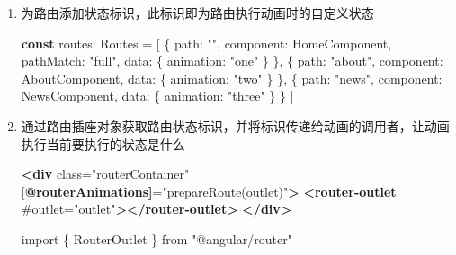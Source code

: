 \documentclass[
]{article}
\newenvironment{Shaded}{}{}
\newcommand{\DataTypeTok}[1]{\textcolor[rgb]{0.56,0.13,0.00}{#1}}
\newcommand{\ErrorTok}[1]{\textcolor[rgb]{1.00,0.00,0.00}{\textbf{#1}}}
\newcommand{\ImportTok}[1]{#1}
\newcommand{\KeywordTok}[1]{\textcolor[rgb]{0.00,0.44,0.13}{\textbf{#1}}}
\newcommand{\NormalTok}[1]{#1}
\newcommand{\OperatorTok}[1]{\textcolor[rgb]{0.40,0.40,0.40}{#1}}
\newcommand{\OtherTok}[1]{\textcolor[rgb]{0.00,0.44,0.13}{#1}}
\newcommand{\StringTok}[1]{\textcolor[rgb]{0.25,0.44,0.63}{#1}}
\begin{document}
\begin{enumerate}
\def\labelenumi{\arabic{enumi}.}
\item
  为路由添加状态标识，此标识即为路由执行动画时的自定义状态

\begin{Shaded}
\begin{Highlighting}[]
\KeywordTok{const}\NormalTok{ routes}\OperatorTok{:}\NormalTok{ Routes }\OperatorTok{=}\NormalTok{ [}
\NormalTok{  \{}
    \DataTypeTok{path}\OperatorTok{:} \StringTok{""}\OperatorTok{,}
    \DataTypeTok{component}\OperatorTok{:}\NormalTok{ HomeComponent}\OperatorTok{,}
    \DataTypeTok{pathMatch}\OperatorTok{:} \StringTok{"full"}\OperatorTok{,}
    \DataTypeTok{data}\OperatorTok{:}\NormalTok{ \{}
      \DataTypeTok{animation}\OperatorTok{:} \StringTok{"one"} 
\NormalTok{    \}}
\NormalTok{  \}}\OperatorTok{,}
\NormalTok{  \{}
    \DataTypeTok{path}\OperatorTok{:} \StringTok{"about"}\OperatorTok{,}
    \DataTypeTok{component}\OperatorTok{:}\NormalTok{ AboutComponent}\OperatorTok{,}
    \DataTypeTok{data}\OperatorTok{:}\NormalTok{ \{}
      \DataTypeTok{animation}\OperatorTok{:} \StringTok{"two"}
\NormalTok{    \}}
\NormalTok{  \}}\OperatorTok{,}
\NormalTok{  \{}
    \DataTypeTok{path}\OperatorTok{:} \StringTok{"news"}\OperatorTok{,}
    \DataTypeTok{component}\OperatorTok{:}\NormalTok{ NewsComponent}\OperatorTok{,}
    \DataTypeTok{data}\OperatorTok{:}\NormalTok{ \{}
      \DataTypeTok{animation}\OperatorTok{:} \StringTok{"three"}
\NormalTok{    \}}
\NormalTok{  \}}
\NormalTok{]}
\end{Highlighting}
\end{Shaded}
\item
  通过路由插座对象获取路由状态标识，并将标识传递给动画的调用者，让动画执行当前要执行的状态是什么

\begin{Shaded}
\begin{Highlighting}[]
\KeywordTok{\textless{}div}\OtherTok{ class=}\StringTok{"routerContainer"}\OtherTok{ [}\ErrorTok{@routerAnimations]}\OtherTok{=}\StringTok{"prepareRoute(outlet)"}\KeywordTok{\textgreater{}}
  \KeywordTok{\textless{}router{-}outlet}\OtherTok{ \#outlet=}\StringTok{"outlet"}\KeywordTok{\textgreater{}\textless{}/router{-}outlet\textgreater{}}
\KeywordTok{\textless{}/div\textgreater{}}
\end{Highlighting}
\end{Shaded}

\begin{Shaded}
\begin{Highlighting}[]
\ImportTok{import}\NormalTok{ \{ RouterOutlet \} }\ImportTok{from} \StringTok{"@angular/router"}


\end{Highlighting}
\end{Shaded}
\end{enumerate}
\end{document}
